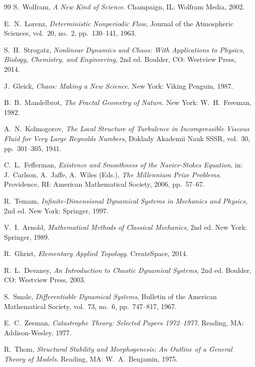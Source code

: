 ﻿\documentclass[12pt, a4paper]{article}
\begin{document}
\begin{thebibliography}{99}
		S.~Wolfram,
		\textit{A New Kind of Science}.
		Champaign, IL: Wolfram Media, 2002.

		E.~N.~Lorenz,
		\textit{Deterministic Nonperiodic Flow},
		Journal of the Atmospheric Sciences, vol.~20, no.~2, pp.~130--141, 1963.

		S.~H.~Strogatz,
		\textit{Nonlinear Dynamics and Chaos: With Applications to Physics, Biology, Chemistry, and Engineering}, 2nd ed.
		Boulder, CO: Westview Press, 2014.

		J.~Gleick,
		\textit{Chaos: Making a New Science}.
		New York: Viking Penguin, 1987.

		B.~B.~Mandelbrot,
		\textit{The Fractal Geometry of Nature}.
		New York: W.~H.~Freeman, 1982.

		A.~N.~Kolmogorov,
		\textit{The Local Structure of Turbulence in Incompressible Viscous Fluid for Very Large Reynolds Numbers},
		Doklady Akademii Nauk SSSR, vol.~30, pp.~301--305, 1941.

		C.~L.~Fefferman,
		\textit{Existence and Smoothness of the Navier-Stokes Equation},
		in: J.~Carlson, A.~Jaffe, A.~Wiles (Eds.), \textit{The Millennium Prize Problems}.
		Providence, RI: American Mathematical Society, 2006, pp.~57--67.

		R.~Temam,
		\textit{Infinite-Dimensional Dynamical Systems in Mechanics and Physics}, 2nd ed.
		New York: Springer, 1997.

		V.~I.~Arnold,
		\textit{Mathematical Methods of Classical Mechanics}, 2nd ed.
		New York: Springer, 1989.

		R.~Ghrist,
		\textit{Elementary Applied Topology}.
		CreateSpace, 2014.

		R.~L.~Devaney,
		\textit{An Introduction to Chaotic Dynamical Systems}, 2nd ed.
		Boulder, CO: Westview Press, 2003.

		S.~Smale,
		\textit{Differentiable Dynamical Systems},
		Bulletin of the American Mathematical Society, vol.~73, no.~6, pp.~747--817, 1967.

		E.~C.~Zeeman,
		\textit{Catastrophe Theory: Selected Papers 1972--1977}.
		Reading, MA: Addison-Wesley, 1977.

		R.~Thom,
		\textit{Structural Stability and Morphogenesis: An Outline of a General Theory of Models}.
		Reading, MA: W.~A.~Benjamin, 1975.


\end{thebibliography}
\end{document}
